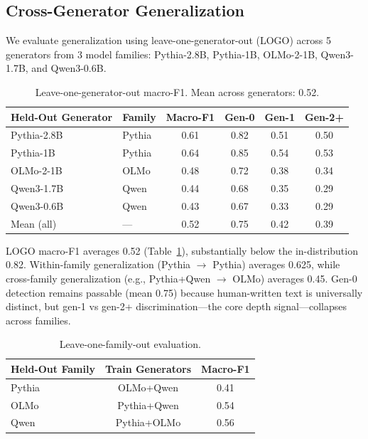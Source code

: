 \documentclass[11pt]{article}
\begin{document}
\subsection{Cross-Generator Generalization}
\label{sec:cross_gen}

We evaluate generalization using leave-one-generator-out (LOGO) across 5 generators from 3 model families: Pythia-2.8B, Pythia-1B, OLMo-2-1B, Qwen3-1.7B, and Qwen3-0.6B.

\begin{table}[h]
\centering
\caption{Leave-one-generator-out macro-F1. Mean across generators: 0.52.}
\label{tab:logo}
\begin{tabular}{llcccc}
\toprule
Held-Out Generator & Family & Macro-F1 & Gen-0 & Gen-1 & Gen-2+ \\
\midrule
Pythia-2.8B & Pythia & 0.61 & 0.82 & 0.51 & 0.50 \\
Pythia-1B & Pythia & 0.64 & 0.85 & 0.54 & 0.53 \\
OLMo-2-1B & OLMo & 0.48 & 0.72 & 0.38 & 0.34 \\
Qwen3-1.7B & Qwen & 0.44 & 0.68 & 0.35 & 0.29 \\
Qwen3-0.6B & Qwen & 0.43 & 0.67 & 0.33 & 0.29 \\
\midrule
Mean (all) & --- & 0.52 & 0.75 & 0.42 & 0.39 \\
\bottomrule
\end{tabular}
\end{table}

LOGO macro-F1 averages 0.52 (Table~\ref{tab:logo}), substantially below the in-distribution 0.82.
Within-family generalization (Pythia $\to$ Pythia) averages 0.625, while cross-family generalization (e.g., Pythia+Qwen $\to$ OLMo) averages 0.45.
Gen-0 detection remains passable (mean 0.75) because human-written text is universally distinct, but gen-1 vs gen-2+ discrimination---the core depth signal---collapses across families.

\begin{table}[h]
\centering
\caption{Leave-one-family-out evaluation.}
\label{tab:lofo}
\begin{tabular}{lcc}
\toprule
Held-Out Family & Train Generators & Macro-F1 \\
\midrule
Pythia & OLMo+Qwen & 0.41 \\
OLMo & Pythia+Qwen & 0.54 \\
Qwen & Pythia+OLMo & 0.56 \\
\bottomrule
\end{tabular}
\end{table}
\end{document}
